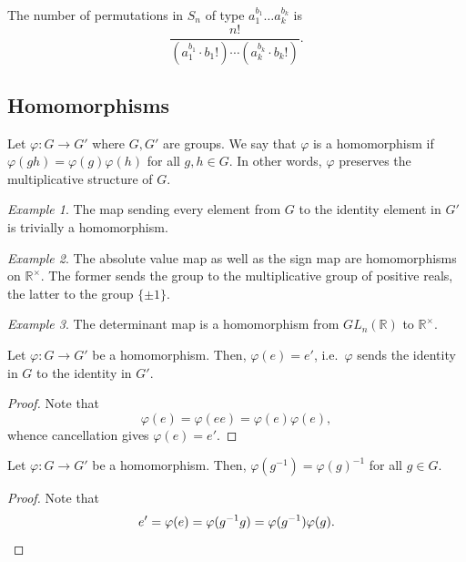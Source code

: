 \documentclass[11pt]{article}
\newcommand{\R}{\mathbb{R}}
\theoremstyle{definition}
\theoremstyle{remark}
\newtheorem*{example}{Example}
\numberwithin{equation}{section}
\begin{document}
    \begin{lemma}
        The number of permutations in $S_n$ of type $a_1^{b_1} \dots a_k^{b_k}$ is \[
            \frac{n!}{(a_1^{b_1}\cdot b_1!) \cdots (a_k^{b_k}\cdot b_k!)}.
        \] 
    \end{lemma}

    \subsection{Homomorphisms}
    \begin{definition}
        Let $\varphi\colon G \to G'$ where $G, G'$ are groups. We say that $\varphi$
        is a homomorphism if $\varphi(gh) = \varphi(g)\varphi(h)$ for all $g, h \in
        G$. In other words, $\varphi$ preserves the multiplicative structure of $G$.
    \end{definition}
    \begin{example}
        The map sending every element from $G$ to the identity element in $G'$ is
        trivially a homomorphism.
    \end{example}
    \begin{example}
        The absolute value map as well as the sign map are homomorphisms on
        $\R^\times$. The former sends the group to the multiplicative group of
        positive reals, the latter to the group $\{\pm 1\}$.
    \end{example}
    \begin{example}
        The determinant map is a homomorphism from $GL_n(\R)$ to $\R^\times$.
    \end{example}

    \begin{lemma}
        Let $\varphi\colon G \to G'$ be a homomorphism. Then, $\varphi(e) = e'$, i.e.\
        $\varphi$ sends the identity in $G$ to the identity in $G'$.
    \end{lemma}
    \begin{proof}
        Note that \[
            \varphi(e) = \varphi(ee) = \varphi(e)\varphi(e),
        \] whence cancellation gives $\varphi(e) = e'$.
    \end{proof}
    \begin{lemma}
        Let $\varphi\colon G \to G'$ be a homomorphism. Then, $\varphi(g^{-1}) =
        \varphi(g)^{-1}$ for all $g \in G$.
    \end{lemma}
    \begin{proof}
        Note that \[
            e' = \varphi(e) = \varphi(g^{-1}g) = \varphi(g^{-1})\varphi(g). \qedhere
        \] 
    \end{proof}
\end{document}
